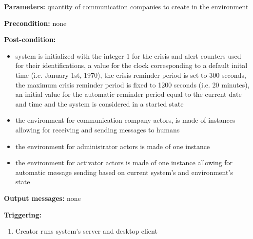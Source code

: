 \begin{description}

\item \textbf{Parameters:} quantity of communication companies to create in the environment
\item \textbf{Precondition:} none
\item \textbf{Post-condition:}
\begin{itemize}
  \item system is initialized with the integer 1 for the crisis
  and alert counters used for their identifications, a value for the clock
  corresponding to a default inital time (i.e. January 1st, 1970), the crisis
  reminder period is set to 300 seconds, the maximum crisis reminder period is
  fixed to 1200 seconds (i.e. 20 minutes), an initial value for the automatic
  reminder period equal to the current date and time and the system is
  considered in a started state
  \item the environment for communication company actors, is
  made of instances allowing for receiving and sending messages to humans
  \item the environment for administrator actors is made of one instance
  \item the environment for activator actors is made of one instance allowing
  for automatic message sending based on current system’s and environment's
  state
\end{itemize}
\item \textbf{Output messages:} none

\item \textbf{Triggering:}
\begin{enumerate}
\item Creator runs system's server and desktop client
\end{enumerate}

\end{description}